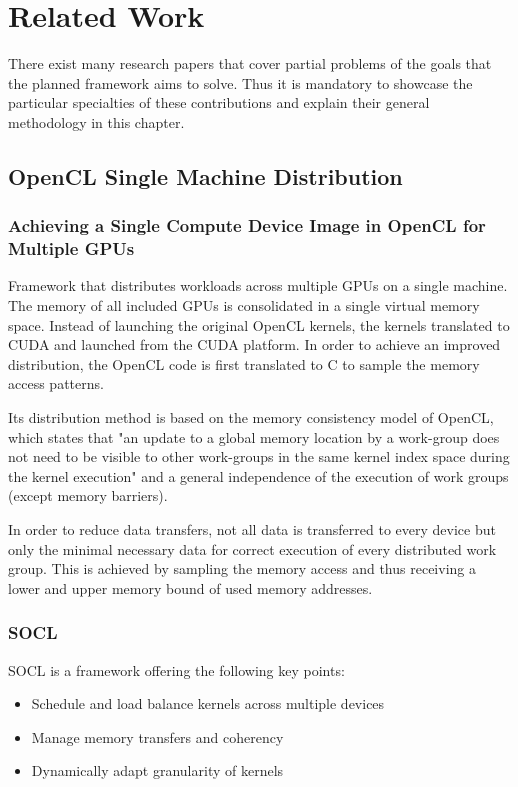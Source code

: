 \chapter{Related Work}


There exist many research papers that cover partial problems of the goals that the planned framework aims to solve. Thus it is mandatory to showcase the particular specialties of these contributions and explain their general methodology in this chapter.

\section{OpenCL Single Machine Distribution}

\subsection*{Achieving a Single Compute Device Image in OpenCL for Multiple GPUs\cite{Kim_2011}}
Framework that distributes workloads across multiple GPUs on a single machine. The memory of all included GPUs is consolidated in a single virtual memory space.
Instead of launching the original OpenCL kernels, the kernels translated to CUDA and launched from the CUDA platform. In order to achieve an improved distribution, the OpenCL code is first translated to C to sample the memory access patterns.

Its distribution method is based on the memory consistency model of OpenCL, which states that "an update to a global memory location by a work-group does not need to be visible to other work-groups in the same kernel index space during the kernel execution" and a general independence of the execution of work groups (except memory barriers).

In order to reduce data transfers, not all data is transferred to every device but only the minimal necessary data for correct execution of every distributed work group. This is achieved by sampling the memory access and thus receiving a lower and upper memory bound of used memory addresses.

\subsection*{SOCL\cite{socl}}
SOCL is a framework offering the following key points:
\begin{itemize}
    \item Schedule and load balance kernels across multiple devices
    \item Manage memory transfers and coherency
    \item Dynamically adapt granularity of kernels
\end{itemize}


